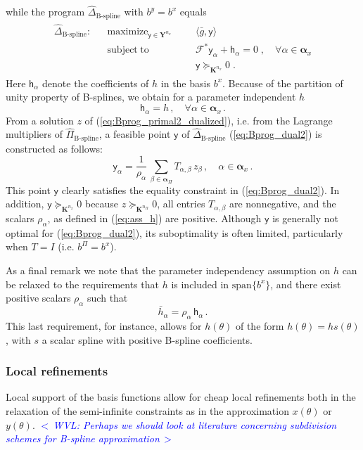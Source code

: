 \documentclass{article}
\DeclareMathOperator*{\maximize}{maximize}
\DeclareMathOperator*{\subj}{subject\;to}
\newcommand{\commentWVL}[1]{\noindent \textcolor{blue}{\emph{$<\,$WVL: #1$\,>$}}}%
\newcommand{\ppar}{\theta}                          %
\newcommand{\Y}{\mathbf{Y}}                         %
\newcommand{\K}{\mathbf{K}}                         %
\newcommand{\calF}{\mathcal{F}}                     %
\newcommand{\bx}{b^x}               %
\newcommand{\nx}{{n_x}}             %
\newcommand{\by}{b^y}               %
\newcommand{\cy}{\textsf{y}}        %
\newcommand{\cya}{\cy_\alpha}       %
\newcommand{\Alpha}{\bm{\alpha}}    %
\newcommand{\meanh}{\bar{h}}        %
\newcommand{\meanha}{\meanh_\alpha} %
\newcommand{\meang}{\bar{g}}        %
\newcommand{\bPi}{b^\Pi}                %
\newcommand{\nPi}{{n_\Pi}}              %
\newcommand{\cha}{\textsf{h}_\alpha}    %
\begin{document}
while the program $\hat{\Delta}_\text{B-spline}$ with $\by=\bx$ equals
\begin{gather}\label{eq:Bprog_dual2}
\begin{aligned}
\hat{\Delta}_\text{B-spline}: && \maximize_{\cy\in\Y^\nx} &&& \langle \meang, \cy \rangle    \\%
                              && \subj                    &&& \calF^* \cya +  \cha = 0 \;, \quad \forall \alpha\in \Alpha_x\\%
                              &&                          &&& \cy \succeq_{\K^\nx} 0 \;.%
\end{aligned}
\end{gather}
Here $\cha$ denote the coefficients of $h$ in the basis $\bx$. Because of the partition of unity property of B-splines, we obtain for a parameter independent $h$
\[ \cha = h\,,\quad\forall\alpha\in\Alpha_x\,.
\]
From a solution $z$ of (\ref{eq:Bprog_primal2_dualized}), i.e. from the Lagrange multipliers of $\hat{\Pi}_\text{B-spline}$, a feasible point $\cy$ of $\hat{\Delta}_\text{B-spline}$ (\ref{eq:Bprog_dual2}) is constructed as follows:
\[ \cya = \frac{1}{\rho_\alpha} \, \sum_{\beta\in\Alpha_\Pi}\! T_{\alpha,\beta}\,z_\beta\,,\quad\alpha\in\Alpha_x\,.%
\]
This point $\cy$ clearly satisfies the equality constraint in (\ref{eq:Bprog_dual2}). In addition, $\cy \succeq_{\K^\nx} 0$ because $z \succeq_{\K^\nPi} 0$, all entries $T_{\alpha,\beta}$ are nonnegative, and the scalars $\rho_\alpha$, as defined in (\ref{eq:ass_h}) are positive. Although $\cy$ is generally not optimal for (\ref{eq:Bprog_dual2}), its suboptimality is often limited, particularly when $T=I$ (i.e. $\bPi=\bx$).

As a final remark we note that the parameter independency assumption on $h$ can be relaxed to the requirements that $h$ is included in $\text{span}\{\bx\}$, and there exist positive scalars $\rho_\alpha$ such that
\[ \meanha = \rho_\alpha \, \cha \,.
\]
This last requirement, for instance, allows for $h(\ppar)$ of the form $h(\ppar)=hs(\ppar)$, with $s$ a scalar spline with positive B-spline coefficients.


\subsubsection{Local refinements}
Local support of the basis functions allow for cheap local refinements both in the relaxation of the semi-infinite constraints as in the approximation $x(\ppar)$ or $y(\ppar)$.
\commentWVL{Perhaps we should look at literature concerning subdivision schemes
for B-spline approximation}
\end{document}
